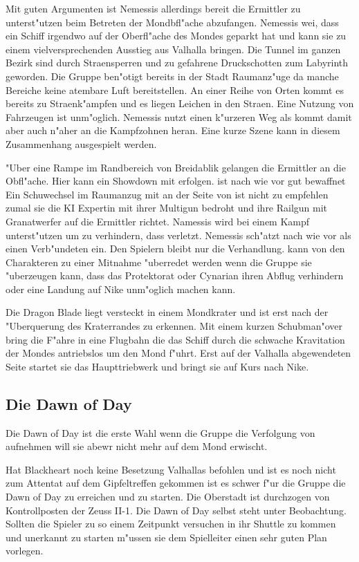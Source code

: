 Mit guten Argumenten ist Nemessis allerdings bereit die Ermittler zu unterst"utzen \xl{} beim Betreten der Mondbfl"ache abzufangen. Nemessis wei\3, dass \xl{} ein Schiff irgendwo auf der Oberfl"ache des Mondes geparkt hat und kann sie zu einem vielversprechenden Ausstieg aus Valhalla bringen. Die Tunnel im ganzen Bezirk sind durch Stra\3ensperren und zu gefahrene Druckschotten zum Labyrinth geworden. Die Gruppe ben"otigt bereits in der Stadt Raumanz"uge da manche Bereiche keine atembare Luft bereitstellen. An einer Reihe von Orten kommt es bereits zu Stra\3enk"ampfen und es liegen Leichen in den Stra\3en. Eine Nutzung von Fahrzeugen ist unm"oglich. Nemessis nutzt einen k"urzeren Weg als \xl{} kommt damit aber auch n"aher an die Kampfzohnen heran. Eine kurze Szene kann in diesem Zusammenhang ausgespielt werden.

"Uber eine Rampe im Randbereich von Breidablik gelangen die Ermittler an die Obfl"ache. Hier kann ein Showdown mit \xl{} erfolgen. \xl{} ist nach wie vor gut bewaffnet Ein Schu\3wechsel im Raumanzug mit \ml{} an der Seite von \xl{} ist nicht zu empfehlen zumal sie die KI Expertin mit ihrer Multigun bedroht und ihre Railgun mit Granatwerfer auf die Ermittler richtet. Namessis wird bei einem Kampf \xl{} unterst"utzen um zu verhindern, dass \ml{} verletzt. Nemessis sch"atzt \xl{} nach wie vor als einen Verb"undeten ein. Den Spielern bleibt nur die Verhandlung. \xl{} kann von den Charakteren zu einer Mitnahme "uberredet werden wenn die Gruppe sie "uberzeugen kann, dass das Protektorat oder Cynarian ihren Abflug verhindern oder eine Landung auf Nike unm"oglich machen kann.

Die Dragon Blade liegt versteckt in einem Mondkrater und ist erst nach der "Uberquerung des Kraterrandes zu erkennen. Mit einem kurzen Schubman"over bring \xl{} die F"ahre in eine Flugbahn die das Schiff durch die schwache Kravitation der Mondes antriebslos um den Mond f"uhrt. Erst auf der Valhalla abgewendeten Seite startet sie das Haupttriebwerk und bringt sie auf Kurs nach Nike. 

\subsection{Die Dawn of Day}
Die Dawn of Day ist die erste Wahl wenn die Gruppe die Verfolgung von \xl{} aufnehmen will sie abewr nicht mehr auf dem Mond erwischt.

Hat Blackheart noch keine Besetzung Valhallas befohlen und ist es noch nicht zum Attentat auf dem Gipfeltreffen gekommen 
ist es schwer f"ur die Gruppe die Dawn of Day zu erreichen und zu starten. Die Oberstadt ist durchzogen von 
Kontrollposten der Zeuss II-1. Die Dawn of Day selbst steht unter Beobachtung. Sollten die Spieler zu 
so einem Zeitpunkt versuchen in ihr Shuttle zu kommen und unerkannt zu starten m"ussen sie dem Spielleiter einen sehr guten Plan vorlegen.

